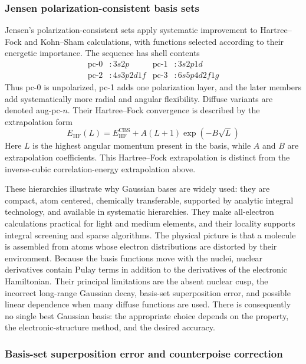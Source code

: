 \subsubsection{Jensen polarization-consistent basis sets}

Jensen's polarization-consistent sets \citep{Jensen2001} apply systematic improvement to Hartree--Fock and
Kohn--Sham calculations, with functions selected according to their energetic
importance. The sequence has shell contents
\begin{align}
  \text{pc-0}&:3s2p &\text{pc-1}&:3s2p1d\\
  \text{pc-2}&:4s3p2d1f &\text{pc-3}&:6s5p4d2f1g
\end{align}
Thus pc-0 is unpolarized, pc-1 adds one polarization layer, and the later
members add systematically more radial and angular flexibility. Diffuse variants
are denoted aug-pc-$n$. Their Hartree--Fock convergence is described by the
extrapolation form \citep{Jensen2005}
\begin{equation}
  E_\text{HF}(L)=E_\text{HF}^\text{CBS}
  +A(L+1)\exp(-B\sqrt L)
\end{equation}
Here $L$ is the highest angular momentum present in the basis, while $A$ and
$B$ are extrapolation coefficients. This Hartree--Fock extrapolation is distinct from
the inverse-cubic correlation-energy extrapolation above.

These hierarchies illustrate why Gaussian bases are widely used: they are
compact, atom centered, chemically transferable, supported
by analytic integral technology, and available in systematic hierarchies.
They make all-electron calculations practical for light and medium elements,
and their locality supports integral screening and sparse algorithms. The
physical picture is that a molecule is assembled from atoms whose electron
distributions are distorted by their environment. Because the basis functions
move with the nuclei, nuclear derivatives contain Pulay terms in addition to
the derivatives of the electronic Hamiltonian.
Their principal limitations are the absent nuclear cusp, the incorrect
long-range Gaussian decay, basis-set superposition error, and possible linear
dependence when many diffuse functions are used. There is consequently no
single best Gaussian basis: the appropriate choice depends on the property,
the electronic-structure method, and the desired accuracy.

\subsubsection{Basis-set superposition error and counterpoise correction}

